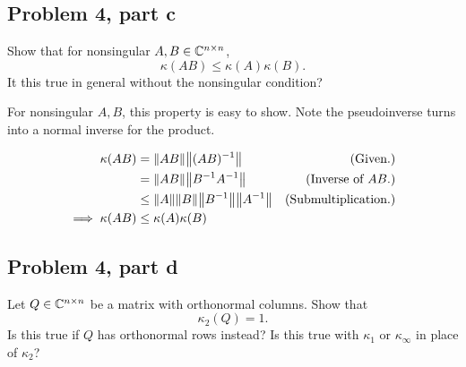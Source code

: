 \subsection{Problem 4, part c}
Show that for nonsingular $A, B \in \mathbb{C}^{n\times n}$, 
\[
\kappa(AB)\leq \kappa(A)\kappa(B).
\]
 It this true in general without the nonsingular condition?
 \partbreak
 \begin{solution}

     For nonsingular $A, B$, this property is easy to show. Note the pseudoinverse turns into a normal inverse for the product.

     \alignbreak
     \begin{align}
         \kappa(AB) &= \norm{AB}\norm{(AB)^{-1}} &\text{(Given.)}\nonumber\\
         &= \norm{AB} \norm{B^{-1}A^{-1}} &\text{(Inverse of $AB$.)}\nonumber\\
         &\leq \norm{A} \norm{B} \norm{B^{-1}} \norm{A^{-1}} &\text{(Submultiplication.)}\nonumber\\
         \implies \kappa(AB) &\leq \kappa(A)\kappa(B)\nonumber
     \end{align}
     \alignbreak
 \end{solution}

\newpage
 \subsection{Problem 4, part d}
 Let $Q \in \mathbb{C}^{n\times n}$ be a matrix with orthonormal columns. Show that 
 \[
 \kappa_2(Q) = 1.
 \]
 Is this true if $Q$ has orthonormal rows instead? Is this true with $\kappa_1$ or $\kappa_\infty$ in place of $\kappa_2$?
 \partbreak
 \begin{solution}
     
 \end{solution}


